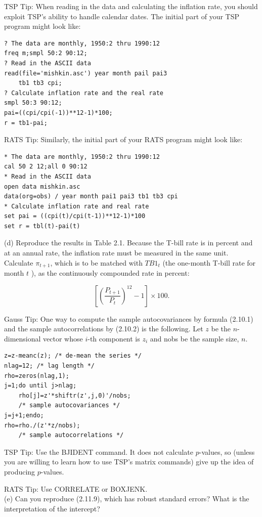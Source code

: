 \documentclass[10pt]{article}
\begin{document}
TSP Tip: When reading in the data and calculating the inflation rate, you should exploit TSP's ability to handle calendar dates. The initial part of your TSP program might look like:

\begin{verbatim}
? The data are monthly, 1950:2 thru 1990:12
freq m;smpl 50:2 90:12;
? Read in the ASCII data
read(file='mishkin.asc') year month pail pai3
    tb1 tb3 cpi;
? Calculate inflation rate and the real rate
smpl 50:3 90:12;
pai=((cpi/cpi(-1))**12-1)*100;
r = tb1-pai;
\end{verbatim}

RATS Tip: Similarly, the initial part of your RATS program might look like:

\begin{verbatim}
* The data are monthly, 1950:2 thru 1990:12
cal 50 2 12;all 0 90:12
* Read in the ASCII data
open data mishkin.asc
data(org=obs) / year month pai1 pai3 tb1 tb3 cpi
* Calculate inflation rate and real rate
set pai = ((cpi(t)/cpi(t-1))**12-1)*100
set r = tbl(t)-pai(t)
\end{verbatim}

(d) Reproduce the results in Table 2.1. Because the T-bill rate is in percent and at an annual rate, the inflation rate must be measured in the same unit. Calculate $\pi_{t+1}$, which is to be matched with $T B 1_{t}$ (the one-month T-bill rate for month $t$ ), as the continuously compounded rate in percent:

$$
\left[\left(\frac{P_{t+1}}{P_{t}}\right)^{12}-1\right] \times 100 .
$$

Gauss Tip: One way to compute the sample autocovariances by formula (2.10.1) and the sample autocorrelations by (2.10.2) is the following. Let $z$ be the $n$-dimensional vector whose $i$-th component is $z_{i}$ and nobs be the sample size, $n$.

\begin{verbatim}
z=z-meanc(z); /* de-mean the series */
nlag=12; /* lag length */
rho=zeros(nlag,1);
j=1;do until j>nlag;
    rho[j]=z'*shiftr(z',j,0)'/nobs;
    /* sample autocovariances */
j=j+1;endo;
rho=rho./(z'*z/nobs);
    /* sample autocorrelations */
\end{verbatim}

TSP Tip: Use the BJIDENT command. It does not calculate $p$-values, so (unless you are willing to learn how to use TSP's matrix commands) give up the idea of producing $p$-values.

RATS Tip: Use CORRELATE or BOXJENK.\\
(e) Can you reproduce (2.11.9), which has robust standard errors? What is the interpretation of the intercept?
\end{document}
